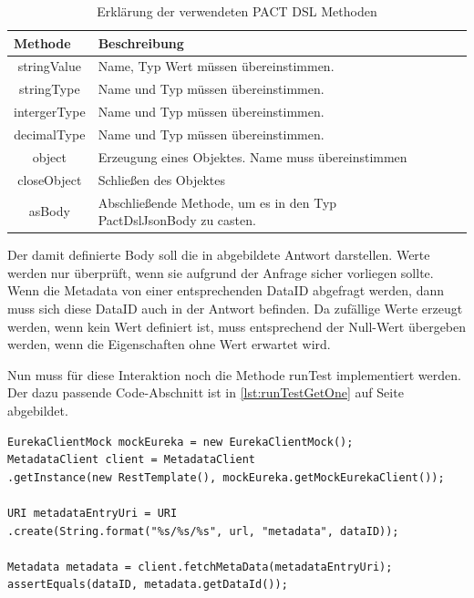 \documentclass{llncs}
\begin{document}
\begin{table}[htbp]
\centering
\begin{tabular}{|c|l|p{4cm}|p{4cm}|}
\hline
\multicolumn{1}{|l|}{Methode} & Beschreibung \\ \hline
stringValue & Name, Typ Wert müssen übereinstimmen. \\ \hline
stringType & Name und Typ müssen übereinstimmen. \\ \hline
intergerType & Name und Typ müssen übereinstimmen. \\ \hline
decimalType & Name und Typ müssen übereinstimmen. \\ \hline
object & Erzeugung eines Objektes. Name muss übereinstimmen  \\ \hline
closeObject & Schließen des Objektes\\ \hline
asBody & Abschließende Methode, um es in den Typ PactDslJsonBody zu casten. \\ \hline
\end{tabular}
\caption{Erklärung der verwendeten PACT DSL Methoden}
\label{tab:Methoden_jsonBody}
\end{table}

Der damit definierte Body soll die in abgebildete Antwort darstellen. Werte werden nur überprüft, wenn sie aufgrund der Anfrage sicher vorliegen sollte. Wenn die Metadata von einer entsprechenden DataID abgefragt werden, dann muss sich diese DataID auch in der Antwort befinden. Da zufällige Werte erzeugt werden, wenn kein Wert definiert ist, muss entsprechend der Null-Wert übergeben werden, wenn die Eigenschaften ohne Wert erwartet wird.

Nun muss für diese Interaktion noch die Methode runTest implementiert werden. Der dazu passende Code-Abschnitt ist in \ref{lst:runTestGetOne} auf Seite \pageref{lst:runTestGetOne} abgebildet.

\lstset{language = Java}
\begin{lstlisting}[caption=Test,label={lst:runTestGetOne}]
EurekaClientMock mockEureka = new EurekaClientMock();
MetadataClient client = MetadataClient
.getInstance(new RestTemplate(), mockEureka.getMockEurekaClient());

URI metadataEntryUri = URI
.create(String.format("%s/%s/%s", url, "metadata", dataID));

Metadata metadata = client.fetchMetaData(metadataEntryUri);
assertEquals(dataID, metadata.getDataId());
\end{lstlisting}
 
\end{document}
